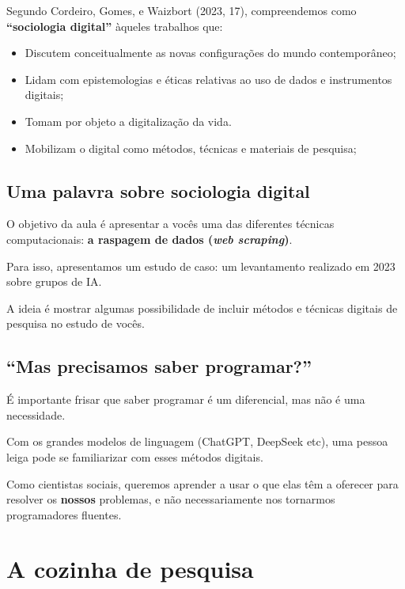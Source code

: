 \documentclass[
  brazilian,
  letterpaper,
  DIV=11,
  numbers=noendperiod]{scrartcl}
\providecommand{\tightlist}{%
  \setlength{\itemsep}{0pt}\setlength{\parskip}{0pt}}
\begin{document}
{Segundo Cordeiro, Gomes, e Waizbort (2023, 17), compreendemos como
\textbf{``sociologia digital''} àqueles trabalhos que:}

\begin{itemize}
\tightlist
\item
  {Discutem conceitualmente as novas configurações do mundo
  contemporâneo;}
\item
  {Lidam com epistemologias e éticas relativas ao uso de dados e
  instrumentos digitais;}
\item
  {Tomam por objeto a digitalização da vida.}
\end{itemize}

\begin{itemize}
\tightlist
\item
  {Mobilizam o digital como métodos, técnicas e materiais de pesquisa;}
\end{itemize}

\subsection{Uma palavra sobre sociologia
digital}\label{uma-palavra-sobre-sociologia-digital-2}

O objetivo da aula é apresentar a vocês uma das diferentes técnicas
computacionais: \textbf{a raspagem de dados (\emph{web scraping})}.

Para isso, apresentamos um estudo de caso: um levantamento realizado em
2023 sobre grupos de IA.

A ideia é mostrar algumas possibilidade de incluir métodos e técnicas
digitais de pesquisa no estudo de vocês.

\subsection{``Mas precisamos saber
programar?''}\label{mas-precisamos-saber-programar}

É importante frisar que saber programar é um diferencial, mas não é uma
necessidade.

Com os grandes modelos de linguagem (ChatGPT, DeepSeek etc), uma pessoa
leiga pode se familiarizar com esses métodos digitais.

Como cientistas sociais, queremos aprender a usar o que elas têm a
oferecer para resolver os \textbf{nossos} problemas, e não
necessariamente nos tornarmos programadores fluentes.

\section{A cozinha de pesquisa}\label{a-cozinha-de-pesquisa}
\end{document}
